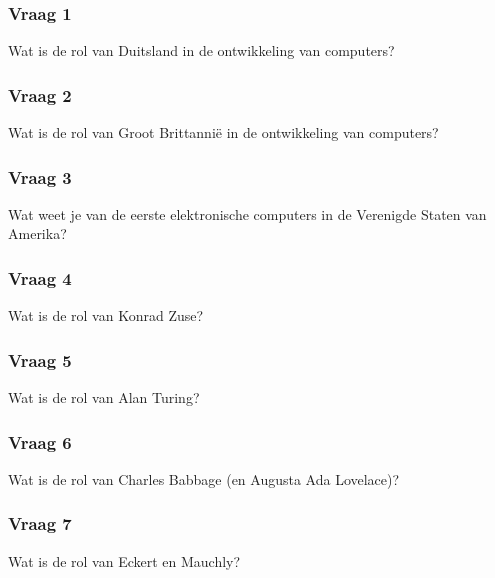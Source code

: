 \documentclass[../main.tex]{subfiles}
\begin{document}
\subsubsection{Vraag 1}
\begin{question}
Wat is de rol van Duitsland in de ontwikkeling van computers?
\end{question}

\subsubsection{Vraag 2}
\begin{question}
Wat is de rol van Groot Brittannië in de ontwikkeling van computers?
\end{question}

\subsubsection{Vraag 3}
\begin{question}
Wat weet je van de eerste elektronische computers in de Verenigde Staten van Amerika?
\end{question}

\subsubsection{Vraag 4}
\begin{question}
Wat is de rol van Konrad Zuse?
\end{question}

\subsubsection{Vraag 5}
\begin{question}
Wat is de rol van Alan Turing?
\end{question}

\subsubsection{Vraag 6}
\begin{question}
Wat is de rol van Charles Babbage (en Augusta Ada Lovelace)?
\end{question}

\subsubsection{Vraag 7}
\begin{question}
Wat is de rol van Eckert en Mauchly?
\end{question}
\end{document}
